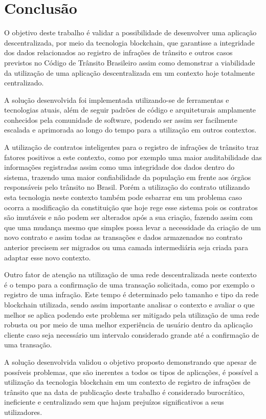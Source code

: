 \chapter[Conclusão]{Conclusão}


O objetivo deste trabalho é validar a possibilidade de desenvolver uma aplicação descentralizada, por meio da tecnologia blockchain, que garantisse a integridade dos dados relacionados ao registro de infrações de trânsito e outros casos previstos no Código de Trânsito Brasileiro assim como demonstrar a viabilidade da utilização de uma aplicação descentralizada em um contexto hoje totalmente centralizado.

A solução desenvolvida foi implementada utilizando-se de ferramentas e tecnologias atuais, além de seguir padrões de código e arquiteturais amplamente conhecidos pela comunidade de software, podendo ser assim ser facilmente escalada e aprimorada ao longo do tempo para a utilização em outros contextos.

A utilização de contratos inteligentes para o registro de infrações de trânsito traz fatores positivos a este contexto, como por exemplo uma maior auditabilidade das informações registradas assim como uma integridade dos dados dentro do sistema, trazendo uma maior confiabilidade da população em frente aos órgãos responsáveis pelo trânsito no Brasil. Porém a utilização do contrato utilizando esta tecnologia neste contexto também pode esbarrar em um problema caso ocorra a modificação da constituição que hoje rege esse sistema pois os contratos são imutáveis e não podem ser alterados após a sua criação, fazendo assim com que uma mudança mesmo que simples possa levar a necessidade da criação de um novo contrato e assim todas as transações e dados armazenados no contrato anterior precisem ser migrados ou uma camada intermediária seja criada para adaptar esse novo contexto.

Outro fator de atenção na utilização de uma rede descentralizada neste contexto é o tempo para a confirmação de uma transação solicitada, como por exemplo o registro de uma infração. Este tempo é determinado pelo tamanho e tipo da rede blockchain utilizada, sendo assim importante analisar o contexto e avaliar o que melhor se aplica podendo este problema ser mitigado pela utilização de uma rede robusta ou por meio de uma melhor experiência de usuário dentro da aplicação cliente caso seja necessário um intervalo considerado grande até a confirmação de uma transação.

A solução desenvolvida validou o objetivo proposto demonstrando que apesar de possíveis problemas, que são inerentes a todos os tipos de aplicações, é possível a utilização da tecnologia blockchain em um contexto de registro de infrações de trânsito que na data de publicação deste trabalho é considerado burocrático, ineficiente e centralizado sem que hajam prejuízos significativos a seus utilizadores. 

